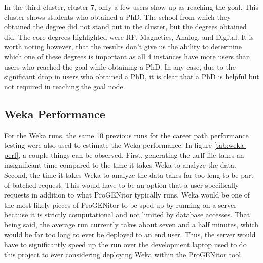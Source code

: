 In the third cluster, cluster 7, only a few users show up as reaching the goal. 
This cluster shows students who obtained a PhD.  The school from which they
obtained the degree did not stand out in the cluster, but the degrees obtained
did.  The core degrees highlighted were RF, Magnetics, Analog, and Digital.  It
is worth noting however, that the results don't give us the ability to determine
which one of these degrees is important as all 4 instances have more users than
users who reached the goal while obtaining a PhD.  In any case, due to the
significant drop in users who obtained a PhD, it is clear that a PhD is helpful
but not required in reaching the goal node.

\subsection{Weka Performance}
For the Weka runs, the same 10 previous runs for the career path performance
testing were also used to estimate the Weka performance.  In figure
\ref{tab:weka-perf}, a couple things can be observed.  First, generating the
.arff file takes an insignificant time compared to the time it takes Weka to
analyze the data.  Second, the time it takes Weka to analyze the data takes far
too long to be part of batched request.  This would have to be an option that a
user specifically requests in addition to what ProGENitor typically runs.  Weka
would be one of the most likely pieces of ProGENitor to be sped up by running on
a server because it is strictly computational and not limited by database
accesses.  That being said, the average run currently takes about seven and a
half minutes, which would be far too long to ever be deployed to an end user. 
Thus, the server would have to significantly speed up the run over the
development laptop used to do this project to ever considering deploying Weka
within the ProGENitor tool.

